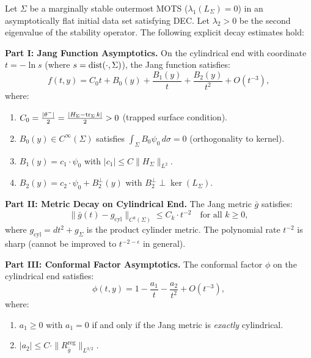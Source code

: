 \begin{proposition}\label{prop:MarginalPolynomialDecay}
Let $\Sigma$ be a marginally stable outermost MOTS ($\lambda_1(L_\Sigma) = 0$) in an asymptotically flat initial data set satisfying DEC. Let $\lambda_2 > 0$ be the second eigenvalue of the stability operator. The following explicit decay estimates hold:

\textbf{Part I: Jang Function Asymptotics.}
On the cylindrical end with coordinate $t = -\ln s$ (where $s = \mathrm{dist}(\cdot, \Sigma)$), the Jang function satisfies:
\begin{equation}
    f(t, y) = C_0 t + B_0(y) + \frac{B_1(y)}{t} + \frac{B_2(y)}{t^2} + O(t^{-3}),
\end{equation}
where:
\begin{enumerate}
    \item $C_0 = \frac{|\theta^-|}{2} = \frac{|H_\Sigma - \operatorname{tr}_\Sigma k|}{2} > 0$ (trapped surface condition).
    \item $B_0(y) \in C^\infty(\Sigma)$ satisfies $\int_\Sigma B_0 \psi_0 \, d\sigma = 0$ (orthogonality to kernel).
    \item $B_1(y) = c_1 \cdot \psi_0$ with $|c_1| \le C \|H_\Sigma\|_{L^2}$.
    \item $B_2(y) = c_2 \cdot \psi_0 + B_2^\perp(y)$ with $B_2^\perp \perp \ker(L_\Sigma)$.
\end{enumerate}

\textbf{Part II: Metric Decay on Cylindrical End.}
The Jang metric $\bar{g}$ satisfies:
\begin{equation}
    \|\bar{g}(t) - g_{\mathrm{cyl}}\|_{C^k(\Sigma)} \le C_k \cdot t^{-2} \quad \text{for all } k \ge 0,
\end{equation}
where $g_{\mathrm{cyl}} = dt^2 + g_\Sigma$ is the product cylinder metric. The polynomial rate $t^{-2}$ is sharp (cannot be improved to $t^{-2-\epsilon}$ in general).

\textbf{Part III: Conformal Factor Asymptotics.}
The conformal factor $\phi$ on the cylindrical end satisfies:
\begin{equation}
    \phi(t, y) = 1 - \frac{a_1}{t} - \frac{a_2}{t^2} + O(t^{-3}),
\end{equation}
where:
\begin{enumerate}
    \item $a_1 \ge 0$ with $a_1 = 0$ if and only if the Jang metric is \emph{exactly} cylindrical.
    \item $|a_2| \le C \cdot \|R_{\bar{g}}^{\mathrm{reg}}\|_{L^{3/2}}$.
\end{enumerate}


\end{proposition}
